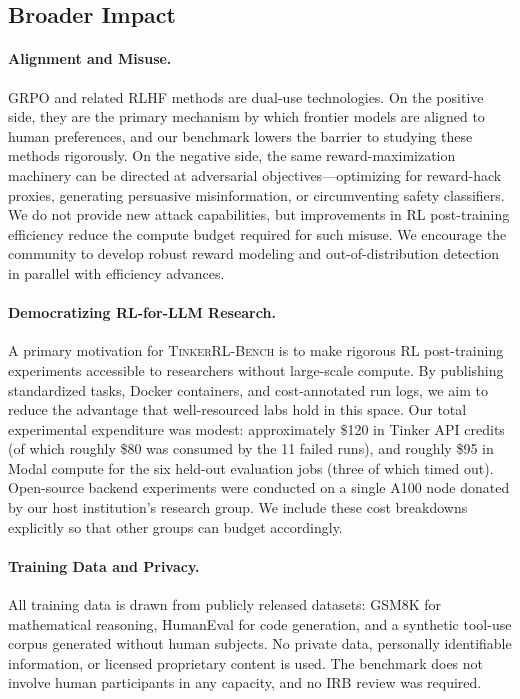 \documentclass{article}
\newcommand{\ours}{\textsc{TinkerRL-Bench}}
\begin{document}
\subsection{Broader Impact}
\label{sec:impact}

\paragraph{Alignment and Misuse.}
GRPO and related RLHF methods are dual-use technologies. On the positive side,
they are the primary mechanism by which frontier models are aligned to human
preferences, and our benchmark lowers the barrier to studying these methods
rigorously. On the negative side, the same reward-maximization machinery can
be directed at adversarial objectives---optimizing for reward-hack proxies,
generating persuasive misinformation, or circumventing safety classifiers. We
do not provide new attack capabilities, but improvements in RL post-training
efficiency reduce the compute budget required for such misuse. We encourage
the community to develop robust reward modeling and out-of-distribution
detection in parallel with efficiency advances.

\paragraph{Democratizing RL-for-LLM Research.}
A primary motivation for \ours{} is to make rigorous RL post-training
experiments accessible to researchers without large-scale compute. By
publishing standardized tasks, Docker containers, and cost-annotated run
logs, we aim to reduce the advantage that well-resourced labs hold in this
space. Our total experimental expenditure was modest: approximately \$120 in
Tinker API credits (of which roughly \$80 was consumed by the 11 failed runs),
and roughly \$95 in Modal compute for the six held-out evaluation jobs
(three of which timed out). Open-source backend experiments were conducted on
a single A100 node donated by our host institution's research group. We include
these cost breakdowns explicitly so that other groups can budget accordingly.

\paragraph{Training Data and Privacy.}
All training data is drawn from publicly released datasets: GSM8K
\citep{cobbe2021training} for mathematical reasoning, HumanEval
\citep{chen2021codex} for code generation, and a synthetic tool-use corpus
generated without human subjects. No private data, personally identifiable
information, or licensed proprietary content is used. The benchmark does not
involve human participants in any capacity, and no IRB review was required.
\end{document}
